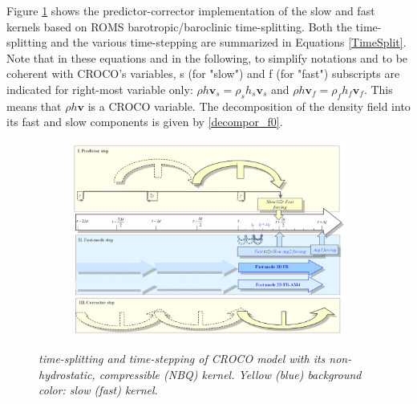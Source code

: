 Figure \ref{ModelTS} shows the predictor-corrector implementation of the slow and fast kernels based on ROMS barotropic/baroclinic time-splitting. Both the time-splitting and the various time-stepping are summarized in Equations \ref{TimeSplit}.
\color{blue}
Note that in these equations and in the following, to simplify notations and to be coherent with CROCO's variables, s (for "slow") and f (for "fast") subscripts are indicated for right-most variable only: $\rho h \mathbf{v}_s=\rho_s h_s \mathbf{v}_s$ and $\rho h \mathbf{v}_f=\rho_f h_f \mathbf{v}_f$. This means that $\rho h \mathbf{v}$ is a CROCO variable. The decomposition of the density field into its fast and slow components is given by  \ref{decompor_f0}.\\
\color{black}
\begin{figure}[!h]
	\centering		
	\begin{subfigure}{1.0\linewidth}
		\includegraphics[width=1\linewidth]{CHAP2/Model_TS.png}
		\caption{}
	\end{subfigure}
\caption{ \textit{time-splitting and time-stepping of CROCO model with its non-hydrostatic, compressible (NBQ) kernel. Yellow (blue) background color: slow (fast) kernel. }}
	\label{ModelTS}
\end{figure}
%
